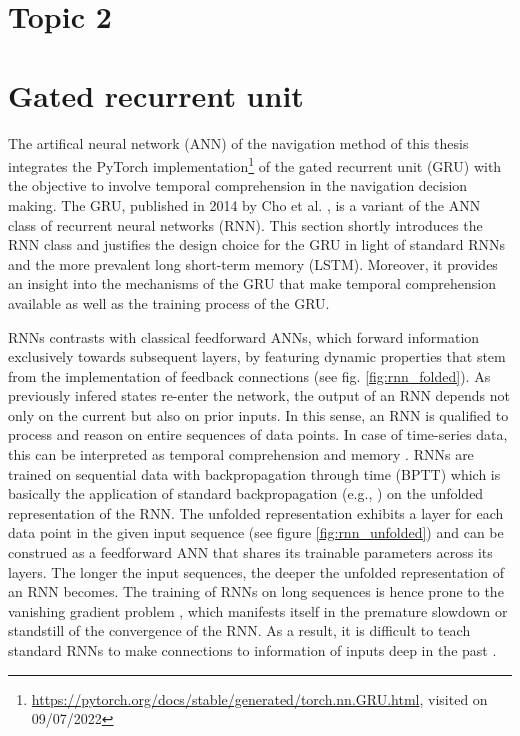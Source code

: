 \section{Topic 2}

\section{Gated recurrent unit}
The artifical neural network (ANN) of the navigation method of this thesis
integrates the PyTorch implementation\footnote{
    \url{https://pytorch.org/docs/stable/generated/torch.nn.GRU.html}, visited on 09/07/2022
}
of the gated recurrent unit (GRU)
with the objective to involve temporal comprehension in
the navigation decision making.
The GRU,
published in 2014 by Cho et al. \cite{Cho2014},
is a variant of the ANN class of recurrent neural networks (RNN).
This section shortly introduces the RNN class
and justifies the design choice for the GRU
in light of standard RNNs and the more prevalent long short-term memory (LSTM).
Moreover, it provides an insight into
the mechanisms of the GRU that make temporal comprehension available
as well as the training process of the GRU.

RNNs contrasts with classical feedforward ANNs,
which forward information exclusively towards subsequent layers,
by featuring dynamic properties 
that stem from the implementation of feedback connections
\cite{Hu2008} (see fig. \ref{fig:rnn_folded}).
As previously infered states re-enter the network,
the output of an RNN depends not only on the 
current but also on prior inputs.
In this sense, an RNN is qualified to process and reason on
entire sequences of data points.
In case of time-series data, this can be interpreted as 
temporal comprehension and memory \cite{ICE2020}.
RNNs are trained on sequential data with
backpropagation through time (BPTT) \cite{pascanu2013difficulty}
which is basically the application of standard backpropagation
(e.g., \cite{Rojas1996})
on the unfolded representation of the RNN.
The unfolded representation exhibits a layer for
each data point in the given input sequence 
(see figure \ref{fig:rnn_unfolded})
and can be construed as a feedforward ANN
that shares its trainable parameters across its layers.
The longer the input sequences,
the deeper the unfolded representation of an RNN becomes.
The training of RNNs on long sequences
is hence prone to the vanishing gradient problem \cite{hochreiter1991untersuchungen},
which manifests itself in the premature slowdown or standstill 
of the convergence of the RNN.
As a result, it is difficult to
teach standard RNNs to
make connections to information of inputs deep in the past
\cite{Bengio1994}.


